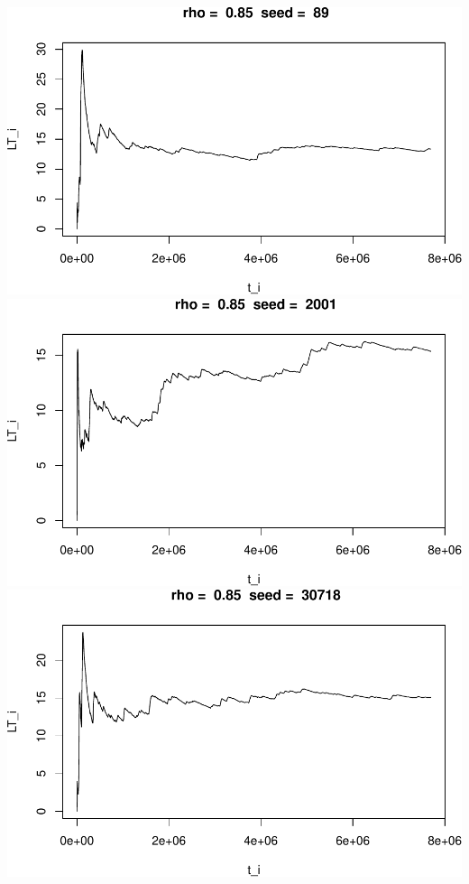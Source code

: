 \documentclass[]{article}
\begin{document}
\includegraphics{003_files/figure-latex/unnamed-chunk-19-7.pdf}
\includegraphics{003_files/figure-latex/unnamed-chunk-19-8.pdf}
\includegraphics{003_files/figure-latex/unnamed-chunk-19-9.pdf}
\end{document}

